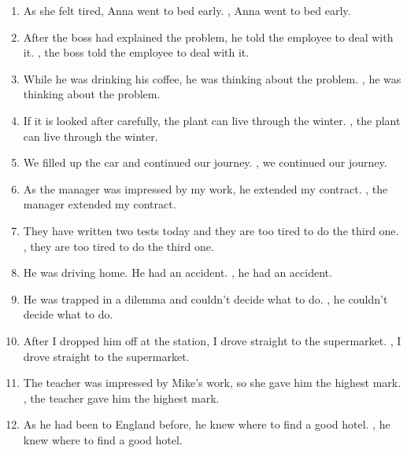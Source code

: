 \begin{enumerate}
      \item As she felt tired, Anna went to bed early. \underline{\hspace{2cm}}, Anna went to bed early.
      \item After the boss had explained the problem, he told the employee to deal with it. \underline{\hspace{2cm}}, the boss told the employee to deal with it.
      \item While he was drinking his coffee, he was thinking about the problem. \underline{\hspace{2cm}}, he was thinking about the problem.
      \item If it is looked after carefully, the plant can live through the winter. \underline{\hspace{2cm}}, the plant can live through the winter.
      \item We filled up the car and continued our journey. \underline{\hspace{2cm}}, we continued our journey.
      \item As the manager was impressed by my work, he extended my contract. \underline{\hspace{2cm}}, the manager extended my contract.
      \item They have written two tests today and they are too tired to do the third one. \underline{\hspace{2cm}}, they are too tired to do the third one.
      \item He was driving home. He had an accident. \underline{\hspace{2cm}}, he had an accident.
      \item He was trapped in a dilemma and couldn’t decide what to do. \underline{\hspace{2cm}}, he couldn’t decide what to do.
      \item After I dropped him off at the station, I drove straight to the supermarket. \underline{\hspace{2cm}}, I drove straight to the supermarket.
      \item The teacher was impressed by Mike’s work, so she gave him the highest mark. \underline{\hspace{2cm}}, the teacher gave him the highest mark.
      \item As he had been to England before, he knew where to find a good hotel. \underline{\hspace{2cm}}, he knew where to find a good hotel.
\end{enumerate}

